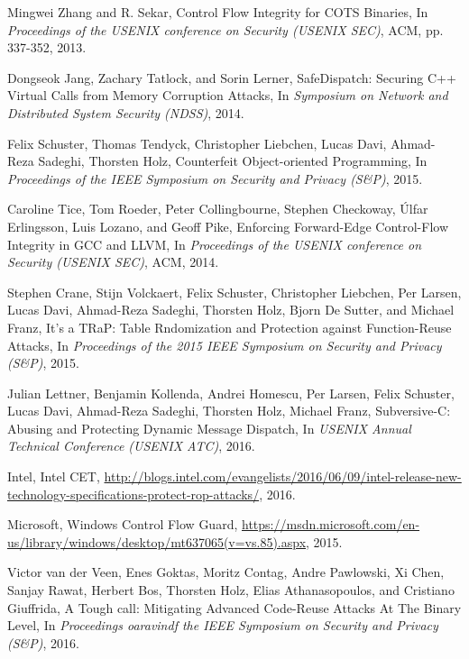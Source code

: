 \documentclass[11pt,a4paper,bibtotoc,idxtotoc,headsepline,footsepline,footexclude,BCOR20mm,DIV10]{scrbook}
\begin{document}
\begin{thebibliography}{50}



Mingwei Zhang and R. Sekar,
{Control Flow Integrity for COTS Binaries}, In
\emph{Proceedings of the USENIX conference on Security (USENIX SEC)}, ACM, pp. 337-352, 2013.

Dongseok Jang, Zachary Tatlock, and Sorin Lerner,
{SafeDispatch: Securing C++ Virtual Calls from Memory Corruption Attacks}, In
\emph{Symposium on Network and Distributed System Security (NDSS)}, 2014.

Felix Schuster, Thomas Tendyck, Christopher Liebchen, Lucas Davi, Ahmad-Reza Sadeghi, Thorsten Holz, 
{Counterfeit Object-oriented Programming}, In
\emph{Proceedings of the IEEE Symposium on Security and Privacy (S\&P)}, 2015.

Caroline Tice, Tom Roeder, Peter Collingbourne, Stephen Checkoway, 
Úlfar Erlingsson, Luis Lozano, and Geoff Pike, 
{Enforcing Forward-Edge Control-Flow Integrity in GCC and LLVM}, In
\emph{Proceedings of the USENIX conference on Security (USENIX SEC)}, ACM, 2014.

Stephen Crane, Stijn Volckaert, Felix Schuster, Christopher Liebchen, Per Larsen,
Lucas Davi, Ahmad-Reza Sadeghi, Thorsten Holz, Bjorn De Sutter, and Michael Franz,
{It's a TRaP: Table Rndomization and Protection against Function-Reuse Attacks}, In
\emph{Proceedings of the 2015 IEEE Symposium on Security and Privacy (S\&P)}, 2015.

Julian Lettner, Benjamin Kollenda, Andrei Homescu, Per Larsen, Felix Schuster,
Lucas Davi, Ahmad-Reza Sadeghi, Thorsten Holz, Michael Franz,
{Subversive-C: Abusing and Protecting Dynamic Message Dispatch}, In
\emph{USENIX Annual Technical Conference (USENIX ATC)}, 2016.

Intel, {Intel CET},
\url{http://blogs.intel.com/evangelists/2016/06/09/intel-release-new-technology-specifications-protect-rop-attacks/}, 2016.

Microsoft,
{Windows Control Flow Guard},
\url{https://msdn.microsoft.com/en-us/library/windows/desktop/mt637065(v=vs.85).aspx}, 2015.

Victor van der Veen, Enes Goktas, Moritz Contag, Andre Pawlowski, Xi Chen, Sanjay Rawat, 
Herbert Bos, Thorsten Holz, Elias Athanasopoulos, and Cristiano Giuffrida,
{A Tough call: Mitigating Advanced Code-Reuse Attacks At The Binary Level}, In
\emph{Proceedings oaravindf the IEEE Symposium on Security and Privacy (S\&P)}, 2016.


\end{thebibliography}
\end{document}

